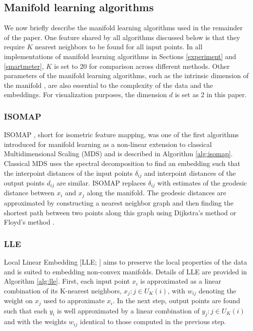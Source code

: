 \documentclass[11pt,a4paper,]{article}
\begin{document}
\hypertarget{ml}{%
\subsection{Manifold learning algorithms}\label{ml}}

We now briefly describe the manifold learning algorithms used in the remainder of the paper. One feature shared by all algorithms discussed below is that they require \(K\) nearest neighbors to be found for all input points. In all implementations of manifold learning algorithms in Sections \ref{experiment} and \ref{smartmeter}, \(K\) is set to 20 for comparison across different methods. Other parameters of the manifold learning algorithms, such as the intrinsic dimension of the manifold \autocite{Denti2021-jl}, are also essential to the complexity of the data and the embeddings. For visualization purposes, the dimension \(d\) is set as 2 in this paper.

\hypertarget{isomap}{%
\subsubsection*{ISOMAP}\label{isomap}}

ISOMAP \autocite{Tenenbaum2000-fr}, short for isometric feature mapping, was one of the first algorithms introduced for manifold learning as a non-linear extension to classical Multidimensional Scaling (MDS) and is described in Algorithm \ref{alg:isomap}. Classical MDS uses the spectral decomposition to find an embedding such that the interpoint distances of the input points \(\delta_{ij}\) and interpoint distances of the output points \(d_{ij}\) are similar. ISOMAP replaces \(\delta_{ij}\) with estimates of the geodesic distance between \(x_i\) and \(x_j\) along the manifold. The geodesic distances are approximated by constructing a nearest neighbor graph and then finding the shortest path between two points along this graph using Dijkstra's method \autocite{Dijkstra1959-ml} or Floyd's method \autocite{Floyd1962-hx}.

\hypertarget{lle}{%
\subsubsection*{LLE}\label{lle}}

Local Linear Embedding {[}LLE; \textcite{Roweis2000-ni}{]} aims to preserve the local properties of the data and is suited to embedding non-convex manifolds. Details of LLE are provided in Algorithm \ref{alg:lle}. First, each input point \(x_i\) is approximated as a linear combination of its K-nearest neighbors, \(x_j:j\in U_K(i)\), with \(w_{ij}\) denoting the weight on \(x_j\) used to approximate \(x_i\). In the next step, output points are found such that each \(y_i\) is well approximated by a linear combination of \(y_j:j\in U_K(i)\) and with the weights \(w_{ij}\) identical to those computed in the previous step.
\end{document}
